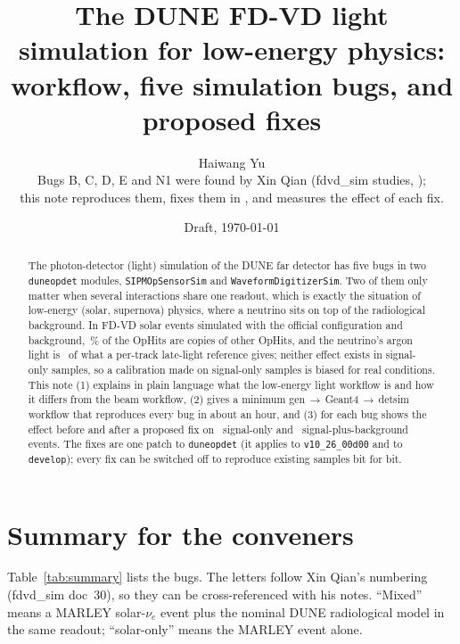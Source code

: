 \documentclass[10pt]{article}
\title{\textbf{The DUNE FD-VD light simulation for low-energy physics:\\
workflow, five simulation bugs, and proposed fixes}}
\author{Haiwang Yu\\[2pt]
\small Bugs B, C, D, E and N1 were found by Xin Qian (fdvd\_sim studies, \href{https://github.com/WireCell/wcp-porting-validation/tree/main/fdvd_sim/docs}{\code{WireCell/wcp-porting-validation}});\\
\small this note reproduces them, fixes them in \code{duneopdet}, and measures the effect of each fix.}
\date{Draft, \today}
\newcommand{\code}[1]{\texttt{#1}}
\begin{document}
\maketitle

\begin{abstract}
\noindent
The photon-detector (light) simulation of the DUNE far detector has five bugs in two \code{duneopdet} modules,
\code{SIPMOpSensorSim} and \code{WaveformDigitizerSim}. Two of them only matter when several interactions share one
readout, which is exactly the situation of low-energy (solar, supernova) physics, where a neutrino sits on top of the
radiological background. In FD-VD solar events simulated with the official configuration and background,
\numBlegacymixduphits\,\% of the OpHits are copies of other OpHits, and the neutrino's argon light is
\numCgainmixratio\ of what a per-track late-light reference gives; neither effect exists in signal-only samples, so a calibration made on
signal-only samples is biased for real conditions. This note (1) explains in plain language what the low-energy
light workflow is and how it differs from the beam workflow, (2) gives a minimum gen\,$\to$\,Geant4\,$\to$\,detsim
workflow that reproduces every bug in about an hour, and (3) for each bug shows the effect before and after a proposed
fix on \numNsol\ signal-only and \numNmix\ signal-plus-background events. The fixes are one patch to \code{duneopdet}
(it applies to \code{v10\_26\_00d00} and to \code{develop}); every fix can be switched off to reproduce existing
samples bit for bit.
\end{abstract}

\tableofcontents
\bigskip

\section{Summary for the conveners}

Table~\ref{tab:summary} lists the bugs. The letters follow Xin Qian's numbering (fdvd\_sim doc~30), so they can be
cross-referenced with his notes. ``Mixed'' means a MARLEY solar-$\nu_e$ event plus the nominal DUNE radiological model
in the same readout; ``solar-only'' means the MARLEY event alone.
\end{document}
